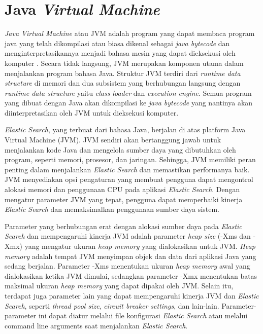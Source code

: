 \section{Java \textit{Virtual Machine}}
\textit{Java Virtual Machine} atau JVM adalah program yang dapat membaca program java yang telah dikompilasi atau biasa dikenal sebagai \textit{java bytecode} dan menginterpretasikannya menjadi bahasa mesin yang dapat dieksekusi oleh komputer \parencite{java12}. Secara tidak langsung, JVM merupakan komponen utama dalam menjalankan program bahasa Java. Struktur JVM terdiri dari \textit{runtime data structure} di memori dan dua subsistem yang berhubungan langsung dengan \textit{runtime data structure} yaitu \textit{class loader} dan \textit{execution engine}. Semua program yang dibuat dengan Java akan dikompilasi ke \textit{java bytecode} yang nantinya akan diinterpretasikan oleh JVM untuk dieksekusi komputer.

\textit{Elastic Search}, yang terbuat dari bahasa Java, berjalan di atas platform Java Virtual Machine (JVM). JVM sendiri akan bertanggung jawab untuk menjalankan kode Java dan mengelola sumber daya yang dibutuhkan oleh program, seperti memori, prosesor, dan jaringan. Sehingga, JVM memiliki peran penting dalam menjalankan \textit{Elastic Search} dan memastikan performanya baik. JVM menyediakan opsi pengaturan yang membuat pengguna dapat mengontrol alokasi memori dan penggunaan CPU pada aplikasi \textit{Elastic Search}. Dengan mengatur parameter JVM yang tepat, pengguna dapat memperbaiki kinerja \textit{Elastic Search} dan memaksimalkan penggunaan sumber daya sistem.

Parameter yang berhubungan erat dengan alokasi sumber daya pada \textit{Elastic Search} dan mempengaruhi kinerja JVM adalah parameter \textit{heap size} (-Xms dan -Xmx) yang mengatur ukuran \textit{heap memory} yang dialokasikan untuk JVM. \textit{Heap memory} adalah tempat JVM menyimpan objek dan data dari aplikasi Java yang sedang berjalan. Parameter -Xms menentukan ukuran \textit{heap memory} awal yang dialokasikan ketika JVM dimulai, sedangkan parameter -Xmx menentukan batas maksimal ukuran \textit{heap memory} yang dapat dipakai oleh JVM. Selain itu, terdapat juga parameter lain yang dapat mempengaruhi kinerja JVM dan \textit{Elastic Search}, seperti \textit{thread pool size}, \textit{circuit breaker settings}, dan lain-lain. Parameter-parameter ini dapat diatur melalui file konfigurasi \textit{Elastic Search} atau melalui command line arguments saat menjalankan \textit{Elastic Search}.